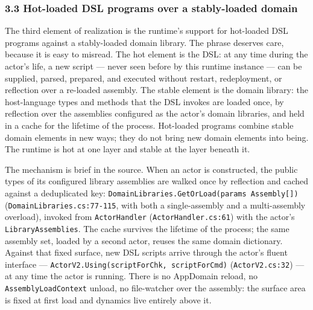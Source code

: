\documentclass[
]{article}
\let\origtexttt\texttt%
\renewcommand{\texttt}[1]{\origtexttt{\seqsplit{#1}}}%
\let\texttt\origtexttt%
\begin{document}
\subsubsection{3.3 Hot-loaded DSL programs over a stably-loaded
domain}\label{hot-loaded-dsl-programs-over-a-stably-loaded-domain}

The third element of realization is the runtime's support for hot-loaded
DSL programs against a stably-loaded domain library. The phrase deserves
care, because it is easy to misread. The hot element is the DSL: at any
time during the actor's life, a new script --- never seen before by this
runtime instance --- can be supplied, parsed, prepared, and executed
without restart, redeployment, or reflection over a re-loaded assembly.
The stable element is the domain library: the host-language types and
methods that the DSL invokes are loaded once, by reflection over the
assemblies configured as the actor's domain libraries, and held in a
cache for the lifetime of the process. Hot-loaded programs combine
stable domain elements in new ways; they do not bring new domain
elements into being. The runtime is hot at one layer and stable at the
layer beneath it.

The mechanism is brief in the source. When an actor is constructed, the
public types of its configured library assemblies are walked once by
reflection and cached against a deduplicated key:
\texttt{DomainLibraries.GetOrLoad(params\ Assembly{[}{]})}
(\texttt{DomainLibraries.cs:77-115}, with both a single-assembly and a
multi-assembly overload), invoked from \texttt{ActorHandler}
(\texttt{ActorHandler.cs:61}) with the actor's
\texttt{LibraryAssemblies}. The cache survives the lifetime of the
process; the same assembly set, loaded by a second actor, reuses the
same domain dictionary. Against that fixed surface, new DSL scripts
arrive through the actor's fluent interface ---
\texttt{ActorV2.Using(scriptForChk,\ scriptForCmd)}
(\texttt{ActorV2.cs:32}) --- at any time the actor is running. There is
no AppDomain reload, no \texttt{AssemblyLoadContext} unload, no
file-watcher over the assembly: the surface area is fixed at first load
and dynamics live entirely above it.
\end{document}
